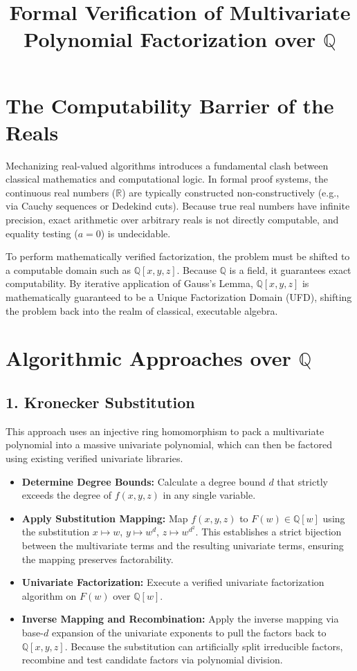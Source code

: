 \documentclass{article}
\title{\vspace{-2cm}\textbf{Formal Verification of Multivariate Polynomial Factorization over $\mathbb{Q}$}}
\author{}
\date{}
\begin{document}
\maketitle
\vspace{-1.5cm}

\section*{The Computability Barrier of the Reals}
Mechanizing real-valued algorithms introduces a fundamental clash between classical mathematics and computational logic. In formal proof systems, the continuous real numbers ($\mathbb{R}$) are typically constructed non-constructively (e.g., via Cauchy sequences or Dedekind cuts). Because true real numbers have infinite precision, exact arithmetic over arbitrary reals is not directly computable, and equality testing ($a = 0$) is undecidable. 

To perform mathematically verified factorization, the problem must be shifted to a computable domain such as $\mathbb{Q}[x,y,z]$. Because $\mathbb{Q}$ is a field, it guarantees exact computability. By iterative application of Gauss's Lemma, $\mathbb{Q}[x,y,z]$ is mathematically guaranteed to be a Unique Factorization Domain (UFD), shifting the problem back into the realm of classical, executable algebra.

\section*{Algorithmic Approaches over $\mathbb{Q}$}

\subsection*{1. Kronecker Substitution}
This approach uses an injective ring homomorphism to pack a multivariate polynomial into a massive univariate polynomial, which can then be factored using existing verified univariate libraries. 

\begin{itemize}
    \item \textbf{Determine Degree Bounds:} Calculate a degree bound $d$ that strictly exceeds the degree of $f(x,y,z)$ in any single variable.
    \item \textbf{Apply Substitution Mapping:} Map $f(x,y,z)$ to $F(w) \in \mathbb{Q}[w]$ using the substitution $x \mapsto w$, $y \mapsto w^d$, $z \mapsto w^{d^2}$. This establishes a strict bijection between the multivariate terms and the resulting univariate terms, ensuring the mapping preserves factorability.
    \item \textbf{Univariate Factorization:} Execute a verified univariate factorization algorithm on $F(w)$ over $\mathbb{Q}[w]$.
    \item \textbf{Inverse Mapping and Recombination:} Apply the inverse mapping via base-$d$ expansion of the univariate exponents to pull the factors back to $\mathbb{Q}[x,y,z]$. Because the substitution can artificially split irreducible factors, recombine and test candidate factors via polynomial division.
\end{itemize}
\end{document}
